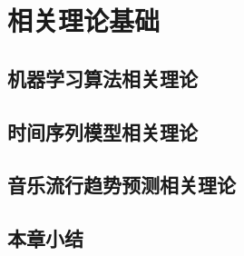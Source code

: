 \chapter{相关理论基础}


\section{机器学习算法相关理论}

\section{时间序列模型相关理论}

\section{音乐流行趋势预测相关理论}

\section{本章小结}
